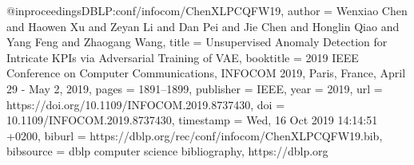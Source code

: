 @inproceedings{DBLP:conf/infocom/ChenXLPCQFW19,
  author    = {Wenxiao Chen and
               Haowen Xu and
               Zeyan Li and
               Dan Pei and
               Jie Chen and
               Honglin Qiao and
               Yang Feng and
               Zhaogang Wang},
  title     = {Unsupervised Anomaly Detection for Intricate KPIs via Adversarial
               Training of {VAE}},
  booktitle = {2019 {IEEE} Conference on Computer Communications, {INFOCOM} 2019,
               Paris, France, April 29 - May 2, 2019},
  pages     = {1891--1899},
  publisher = {{IEEE}},
  year      = {2019},
  url       = {https://doi.org/10.1109/INFOCOM.2019.8737430},
  doi       = {10.1109/INFOCOM.2019.8737430},
  timestamp = {Wed, 16 Oct 2019 14:14:51 +0200},
  biburl    = {https://dblp.org/rec/conf/infocom/ChenXLPCQFW19.bib},
  bibsource = {dblp computer science bibliography, https://dblp.org}
}